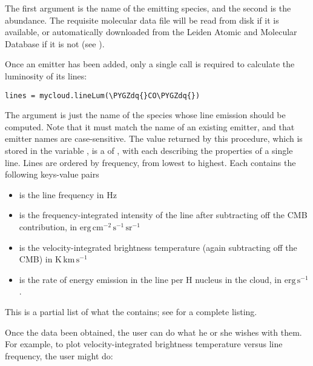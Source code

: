 \documentclass[letterpaper,10pt,english]{sphinxmanual}
\def\PYGZdq{\char`\"}
\begin{document}
The first argument is the name of the emitting species, and the second
is the abundance. The requisite molecular data file will be read from
disk if it is available, or automatically downloaded from the Leiden
Atomic and Molecular Database if it is not (see {\hyperref[data:sec-data]{\emph{}}}).

Once an emitter has been added, only a single call is required to
calculate the luminosity of its lines:

\begin{Verbatim}[commandchars=\\\{\}]
lines = mycloud.lineLum(\PYGZdq{}CO\PYGZdq{})
\end{Verbatim}

The argument is just the name of the species whose line emission
should be computed. Note that it must match the name of an existing
emitter, and that emitter names are case-sensitive. The value returned
by this procedure, which is stored in the variable , is a
 of , with each  describing the properties of
a single line. Lines are ordered by frequency, from lowest to
highest. Each  contains the following keys-value pairs
\begin{itemize}
\item {} 
 is the line frequency in Hz

\item {} 
 is the frequency-integrated intensity of the line
after subtracting off the CMB contribution, in
\(\mathrm{erg}\,\mathrm{cm}^{-2}\,\mathrm{s}^{-1}\,\mathrm{sr}^{-1}\)

\item {} 
 is the velocity-integrated brightness temperature (again
subtracting off the CMB) in
\(\mathrm{K}\,\mathrm{km}\,\mathrm{s}^{-1}\)

\item {} 
 is the rate of energy emission in the line per H nucleus
in the cloud, in \(\mathrm{erg}\,\mathrm{s}^{-1}\).

\end{itemize}

This is a partial list of what the  contains; see
{\hyperref[fulldoc:sssec-full-cloud]{\emph{}}} for a complete listing.

Once the data been obtained, the user can do what he or she wishes
with them. For example, to plot velocity-integrated brightness
temperature versus line frequency, the user might do:
\end{document}

